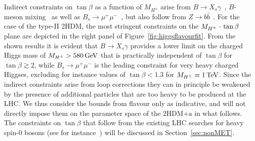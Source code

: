 \documentclass[a4paper, 11pt,notoc]{article}
\newcommand{\hdma}{\ensuremath{\textrm{2HDM+a}}\xspace}
\begin{document}
Indirect constraints on $\tan \beta$ as a function of $M_{H^\pm}$ arise from $B \to X_s \gamma$~\cite{Hermann:2012fc,Misiak:2015xwa,Misiak:2017bgg}, $B$-meson mixing~\cite{Abbott:1979dt,Geng:1988bq,Buras:1989ui,Kirk:2017juj} as well as  $B_s \to \mu^+ \mu^-$~\cite{Skiba:1992mg,Logan:2000iv,Chankowski:2000ng,Bobeth:2001sq,Bobeth:2013uxa,CMS:2014xfa,Aaij:2017vad}, but also follow from $Z \to b \bar b$~\cite{Denner:1991ie,Haisch:2007ia,Freitas:2012sy}. For the case of the type-II 2HDM, the most stringent constraints on the $M_{H^{\pm}}\hspace{0.5mm}$--$\hspace{0.5mm}\tan \beta$ plane are depicted in the right panel of Figure~\ref{fig:higgsflavourfit}. From the shown results it is evident that $B \to X_s \gamma$ provides a lower limit on the charged Higgs mass of $M_{H^\pm} > 580 \, {\rm GeV}$ that is practically independent of $\tan \beta$ for $\tan \beta \gtrsim 2$, while $B_s \to \mu^+ \mu^-$ is the leading constraint for very heavy charged Higgses, excluding for instance values of $\tan \beta < 1.3$ for $M_{H^\pm} = 1 \, {\rm TeV}$.  Since the  indirect constraints   arise from loop corrections they can in principle be weakened by the presence of additional particles that are too heavy to be produced at the LHC. We thus consider the bounds from flavour only as indicative, and will not directly impose them on the parameter space of the \hdma in what follows. The constraints on $\tan \beta$ that follow from the existing LHC searches for heavy spin-0 bosons (see for instance~\cite{Aaboud:2017sjh,Sirunyan:2018zut,Aaboud:2017hnm,ATLAS-CONF-2016-104,Sirunyan:2017roi,Aaboud:2018xuw}) will be discussed in Section~\ref{sec:nonMET}.
\end{document}
